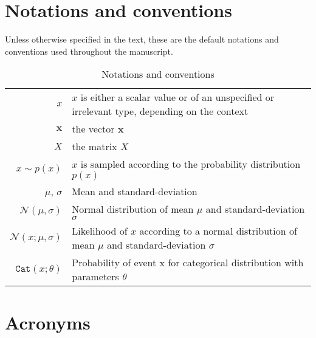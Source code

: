 \documentclass[11pt,leqno]{report}
\begin{document}
\tableofcontents

%








%




\appendix
\chapter{Notations and conventions}

Unless otherwise specified in the text, these are the default notations and conventions used throughout the manuscript.

\begin{table}[h]
    \centering
    \begin{tabular}{r|l}
        $x$ & $x$ is either a scalar value or of an unspecified or irrelevant type, depending on the context \\
        $\textbf{x}$ & the vector $\textbf{x}$ \\
        $X$ & the matrix $X$ \\
        $x \sim p(x)$ & $x$ is sampled according to the probability distribution $p(x)$ \\
        $\mu$, $\sigma$ & Mean and standard-deviation \\
        $\mathcal{N}(\mu, \sigma)$ & Normal distribution of mean $\mu$ and standard-deviation $\sigma$ \\
        $\mathcal{N}(x ; \mu, \sigma)$ & Likelihood of $x$ according to a normal distribution of mean $\mu$ and standard-deviation $\sigma$ \\
        $\texttt{Cat}(x ; \theta)$ & Probability of event x for categorical distribution with parameters $\theta$ \\
    \end{tabular}
    \caption{Notations and conventions}
    \label{tab:my_label}
\end{table}

\chapter{Acronyms}

\end{document}
